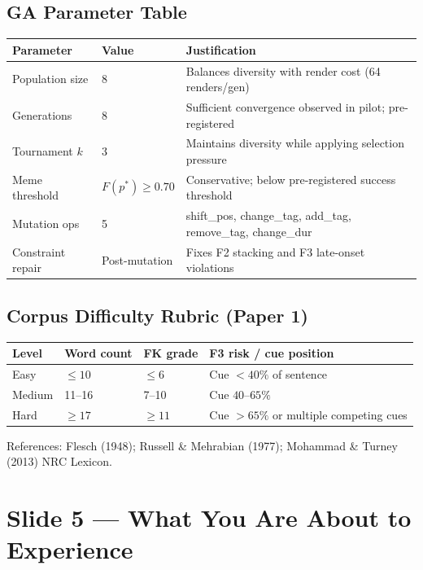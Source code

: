 \documentclass[12pt,a4paper]{article}
\begin{document}
\subsection{GA Parameter Table}

\begin{center}
\begin{tabular}{@{}lll@{}}
\toprule
\textbf{Parameter} & \textbf{Value} & \textbf{Justification} \\
\midrule
Population size & 8 & Balances diversity with render cost (64 renders/gen) \\
Generations & 8 & Sufficient convergence observed in pilot; pre-registered \\
Tournament $k$ & 3 & Maintains diversity while applying selection pressure \\
Meme threshold & $F(p^*) \geq 0.70$ & Conservative; below pre-registered success threshold \\
Mutation ops & 5 & shift\_pos, change\_tag, add\_tag, remove\_tag, change\_dur \\
Constraint repair & Post-mutation & Fixes F2 stacking and F3 late-onset violations \\
\bottomrule
\end{tabular}
\end{center}

\subsection{Corpus Difficulty Rubric (Paper 1)}

\begin{center}
\begin{tabular}{@{}llll@{}}
\toprule
\textbf{Level} & \textbf{Word count} & \textbf{FK grade} & \textbf{F3 risk / cue position} \\
\midrule
Easy & $\leq 10$ & $\leq 6$ & Cue $< 40\%$ of sentence \\
Medium & 11--16 & 7--10 & Cue $40\text{--}65\%$ \\
Hard & $\geq 17$ & $\geq 11$ & Cue $> 65\%$ or multiple competing cues \\
\bottomrule
\end{tabular}
\end{center}

References: Flesch (1948); Russell \& Mehrabian (1977); Mohammad \& Turney (2013) NRC Lexicon.

\newpage
\section{Slide 5 --- What You Are About to Experience}
\end{document}
